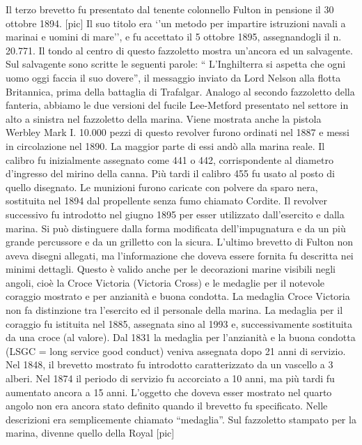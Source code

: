 Il terzo brevetto fu presentato dal tenente colonnello Fulton in
pensione il 30 ottobre 1894. {[}pic{]} Il suo titolo era `'un metodo per
impartire istruzioni navali a marinai e uomini di mare'', e fu accettato
il 5 ottobre 1895, assegnandogli il n. 20.771. Il tondo al centro di
questo fazzoletto mostra un'ancora ed un salvagente. Sul salvagente sono
scritte le seguenti parole: `` L'Inghilterra si aspetta che ogni uomo
oggi faccia il suo dovere'', il messaggio inviato da Lord Nelson alla
flotta Britannica, prima della battaglia di Trafalgar. Analogo al
secondo fazzoletto della fanteria, abbiamo le due versioni del fucile
Lee-Metford presentato nel settore in alto a sinistra nel fazzoletto
della marina. Viene mostrata anche la pistola Werbley Mark I. 10.000
pezzi di questo revolver furono ordinati nel 1887 e messi in
circolazione nel 1890. La maggior parte di essi andò alla marina reale.
Il calibro fu inizialmente assegnato come 441 o 442, corrispondente al
diametro d'ingresso del mirino della canna. Più tardi il calibro 455 fu
usato al posto di quello disegnato. Le munizioni furono caricate con
polvere da sparo nera, sostituita nel 1894 dal propellente senza fumo
chiamato Cordite. Il revolver successivo fu introdotto nel giugno 1895
per esser utilizzato dall'esercito e dalla marina. Si può distinguere
dalla forma modificata dell'impugnatura e da un più grande percussore e
da un grilletto con la sicura. L'ultimo brevetto di Fulton non aveva
disegni allegati, ma l'informazione che doveva essere fornita fu
descritta nei minimi dettagli. Questo è valido anche per le decorazioni
marine visibili negli angoli, cioè la Croce Victoria (Victoria Cross) e
le medaglie per il notevole coraggio mostrato e per anzianità e buona
condotta. La medaglia Croce Victoria non fa distinzione tra l'esercito
ed il personale della marina. La medaglia per il coraggio fu istituita
nel 1885, assegnata sino al 1993 e, successivamente sostituita da una
croce (al valore). Dal 1831 la medaglia per l'anzianità e la buona
condotta (LSGC = long service good conduct) veniva assegnata dopo 21
anni di servizio. Nel 1848, il brevetto mostrato fu introdotto
caratterizzato da un vascello a 3 alberi. Nel 1874 il periodo di
servizio fu accorciato a 10 anni, ma più tardi fu aumentato ancora a 15
anni. L'oggetto che doveva esser mostrato nel quarto angolo non era
ancora stato definito quando il brevetto fu specificato. Nelle
descrizioni era semplicemente chiamato ``medaglia''. Sul fazzoletto
stampato per la marina, divenne quello della Royal {[}pic{]}

